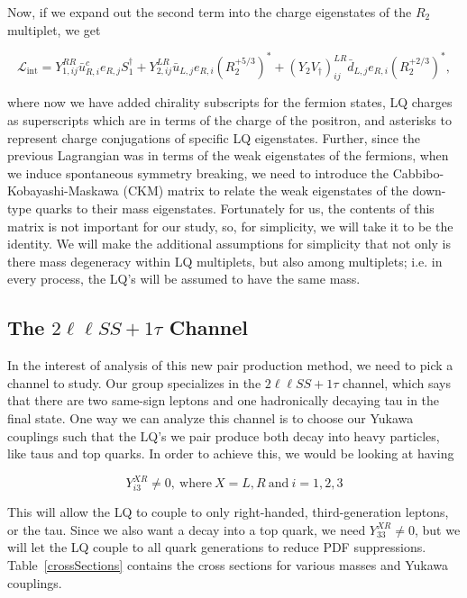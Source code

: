         Now, if we expand out the second term into the charge eigenstates of the $R_2$ multiplet, we get

        \begin{equation}
            \mathcal{L}_{\text{int}} = Y_{1,ij}^{RR} \bar{u}^c_{R,i} e_{R,j} S_1^{\dagger} + Y_{2,ij}^{LR} \bar{u}_{L,j} e_{R,i}  (R_2^{+5/3})^* + (Y_2 V_{\dagger})_{ij}^{LR}\bar{d}_{L,j} e_{R,i}  (R_2^{+2/3})^*,
        \end{equation}

        where now we have added chirality subscripts for the fermion states, LQ charges as superscripts which are in terms of the charge of the positron, and asterisks to represent charge conjugations of specific LQ eigenstates. Further, since the previous Lagrangian was in terms of the weak eigenstates of the fermions, when we induce spontaneous symmetry breaking, we need to introduce the Cabbibo-Kobayashi-Maskawa (CKM) matrix to relate the weak eigenstates of the down-type quarks to their mass eigenstates. Fortunately for us, the contents of this matrix is not important for our study, so, for simplicity, we will take it to be the identity. We will make the additional assumptions for simplicity that not only is there mass degeneracy within LQ multiplets, but also among multiplets; i.e. in every process, the LQ's will be assumed to have the same mass.



    \subsection{The \texorpdfstring{$2\ell\ell SS+1\tau$}{2llSS+1tau} Channel}
        In the interest of analysis of this new pair production method, we need to pick a channel to study. Our group specializes in the $2\ell\ell SS+1\tau$ channel, which says that there are two same-sign leptons and one hadronically decaying tau in the final state. One way we can analyze this channel is to choose our Yukawa couplings such that the LQ's we pair produce both decay into heavy particles, like taus and top quarks. In order to achieve this, we would be looking at having
        
        \begin{equation}
            Y^{XR}_{i3} \neq 0,\ \text{where}\ X=L,R\ \text{and}\ i=1,2,3    
        \end{equation}\label{yukawaMatrixElements}

         This will allow the LQ to couple to only right-handed, third-generation leptons, or the tau. Since we also want a decay into a top quark, we need $Y^{XR}_{33} \neq 0$, but we will let the LQ couple to all quark generations to reduce PDF suppressions. Table~\ref{crossSections} contains the cross sections for various masses and Yukawa couplings.

